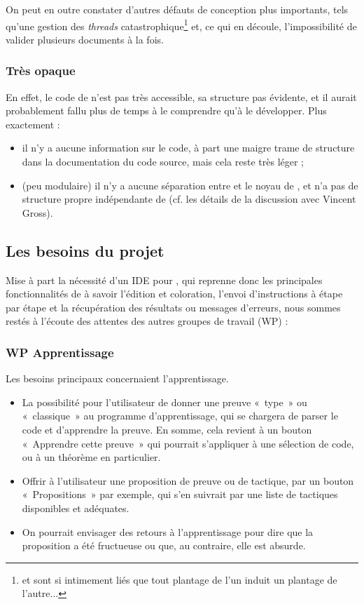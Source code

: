         On peut en outre constater d'autres défauts de conception plus importants, tels qu'une gestion des \emph{threads} catastrophique\footnote{\coqtop{} et \coqide{} sont si intimement liés que tout plantage de l'un induit un plantage de l'autre...} et, ce qui en découle, l'impossibilité de valider plusieurs documents à la fois.
			
        \subsubsection{Très opaque}

		En effet, le code de \coqide{} n'est pas très accessible, sa structure pas évidente, et il aurait probablement fallu plus de temps à le comprendre qu'à le développer. Plus exactement :
		\begin{itemize}
			\item il n'y a aucune information sur le code, à part une maigre trame de structure dans la documentation du code source, mais cela reste très léger ;
			\item (peu modulaire) il n'y a aucune séparation entre \coqide{} et le noyau de \coq{}, et \coqide{} n'a pas de structure propre indépendante de \coq{} (cf. les détails de la discussion avec Vincent Gross).	
		\end{itemize}
		
	\subsection{Les besoins du projet \coquille}

		Mise à part la nécessité d'un IDE pour \coq{}, qui reprenne donc les principales fonctionnalités de \coqide{} à savoir l'édition et coloration, l'envoi d'instructions à \coqtop{} étape par étape et la récupération des résultats ou messages d'erreurs, nous sommes restés à l'écoute des attentes des autres groupes de travail (WP) :
        
        \subsubsection{WP Apprentissage}

        Les besoins principaux concernaient l'apprentissage.
		\begin{itemize}
			\item La possibilité pour l'utilisateur de donner une preuve « type » ou « classique » au programme d'apprentissage, qui se chargera de parser le code et d'apprendre la preuve. En somme, cela revient à un bouton « Apprendre cette preuve » qui pourrait s'appliquer à une sélection de code, ou à un théorème en particulier.
			\item Offrir à l'utilisateur une proposition de preuve ou de tactique, par un bouton « Propositions » par exemple, qui s'en suivrait par une liste de tactiques disponibles et adéquates.
			\item On pourrait envisager des retours à l'apprentissage pour dire que la proposition a été fructueuse ou que, au contraire, elle est absurde.
		\end{itemize}
			
